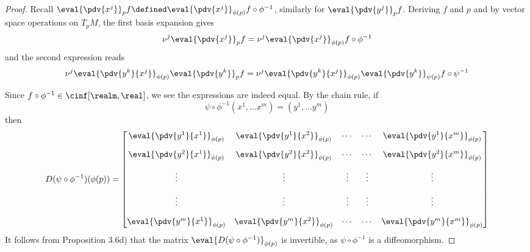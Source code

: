 \documentclass[../main-v2-manifolds.tex]{subfiles}
\begin{document}
\begin{proof}
    Recall $\eval{\pdv{x^j}}_{p}f \defined \eval{\pdv{x^j}}_{\phi(p)} f\circ\phi^{-1}$, similarly for $\eval{\pdv{y^j}}_{p}f$. Deriving $f$ and $p$ and by vector space operations on $T_pM$, the first basis expansion gives
    \begin{equation}\label{lee-chap-1-basis-expansion-1}
        \nu^j\eval{\pdv{x^j}}_{p}f = \nu^j\eval{\pdv{x^j}}_{\phi(p)}f\circ\phi^{-1}
    \end{equation}
    and the second expression reads
    \begin{equation}\label{lee-chap-1-basis-expansion-2}
        \nu^j\eval{\pdv{y^k}{x^j}}_{\phi(p)}\eval{\pdv{y^k}}_p f = \nu^j\eval{\pdv{y^k}{x^j}}_{\phi(p)}\eval{\pdv{y^k}}_{\psi(p)}f\circ\psi^{-1}
    \end{equation}
    
    Since $f\circ\phi^{-1}\in \cinf[\realm,\real]$, we see the expressions are indeed equal. By the chain rule, if
    \[
        \psi\circ\phi^{-1}(x^1,\ldots x^m) = (y^1,\ldots y^m)
    \]
    then
    \[
        D(\psi\circ\phi^{-1})(\phi(p)) = \begin{bmatrix}\eval{\pdv{y^1}{x^1}}_{\phi(p)} & \eval{\pdv{y^1}{x^2}}_{\phi(p)} & \cdots & \cdots & \eval{\pdv{y^1}{x^m}}_{\phi(p)} \\[1em] \eval{\pdv{y^2}{x^1}}_{\phi(p)} & \eval{\pdv{y^2}{x^2}}_{\phi(p)} & \cdots & \cdots & \eval{\pdv{y^2}{x^m}}_{\phi(p)} \\[1em] \vdots & \vdots & \vdots & \vdots & \vdots \\[1em] \vdots & \vdots & \vdots & \vdots & \vdots \\[1em] \eval{\pdv{y^m}{x^1}}_{\phi(p)} & \eval{\pdv{y^m}{x^2}}_{\phi(p)} & \cdots & \cdots & \eval{\pdv{y^m}{x^m}}_{\phi(p)}\end{bmatrix}
    \]
    It follows from Proposition 3.6d) that the matrix $\eval{D(\psi\circ\phi^{-1})}_{\phi(p)}$ is invertible, as $\psi\circ\phi^{-1}$ is a diffeomorphism.
\end{proof}
\end{document}
